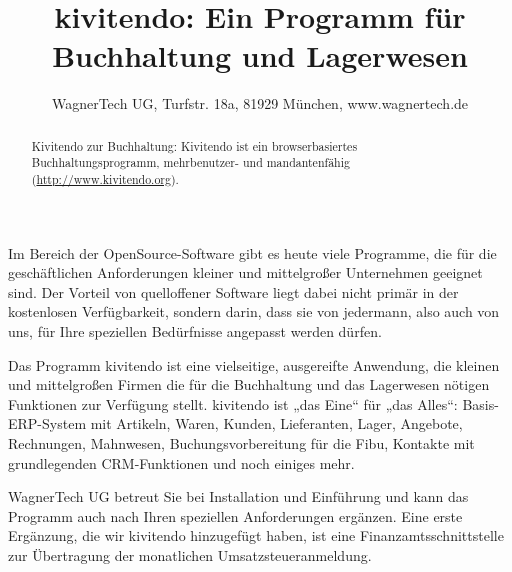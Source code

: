 \documentclass{scrartcl}
\title{kivitendo: Ein Programm für Buchhaltung und Lagerwesen}
\author{WagnerTech UG, Turfstr. 18a, 81929 München, www.wagnertech.de}
\date{\vspace{-5ex}}
\begin{document}
\maketitle

\begin{abstract}
Kivitendo zur Buchhaltung: Kivitendo ist ein browserbasiertes Buchhaltungsprogramm, mehrbenutzer- und mandantenfähig (\url{http://www.kivitendo.org}).

\end{abstract}

\begin{multicols}{2}
Im Bereich der OpenSource-Software gibt es heute viele Programme, die für die geschäftlichen Anforderungen kleiner und mittelgroßer Unternehmen geeignet sind. Der Vorteil von quelloffener Software liegt dabei nicht primär in der kostenlosen Verfügbarkeit, sondern darin, dass sie von jedermann, also auch von uns, für Ihre speziellen Bedürfnisse angepasst werden dürfen.

Das Programm kivitendo ist eine vielseitige, ausgereifte Anwendung, die kleinen und mittelgroßen Firmen
die für die Buchhaltung und das Lagerwesen nötigen Funktionen zur Verfügung stellt. kivitendo ist „das Eine“ für „das Alles“: Basis-ERP-System mit Artikeln, Waren, Kunden, Lieferanten, Lager, Angebote, Rechnungen, Mahnwesen, Buchungsvorbereitung für die Fibu, Kontakte mit grundlegenden CRM-Funktionen und noch einiges mehr. 

WagnerTech UG betreut Sie bei Installation und Einführung und kann das Programm auch nach Ihren speziellen Anforderungen
ergänzen. Eine erste Ergänzung, die wir kivitendo hinzugefügt haben, ist eine Finanzamtsschnittstelle zur Übertragung der
monatlichen Umsatzsteueranmeldung.
\end{multicols}
\end{document}
